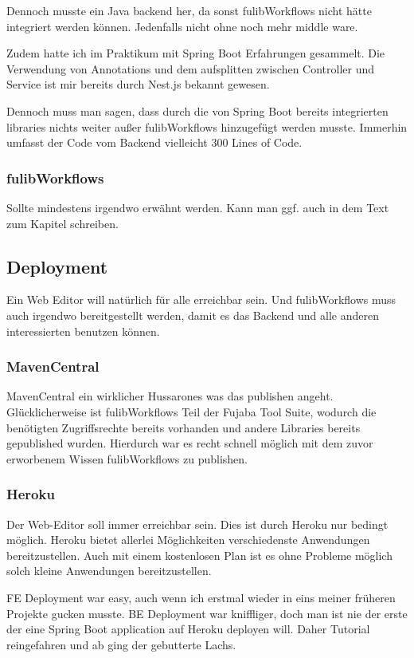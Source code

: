 Dennoch musste ein Java backend her, da sonst fulibWorkflows nicht hätte integriert werden können.
Jedenfalls nicht ohne noch mehr middle ware.

Zudem hatte ich im Praktikum mit Spring Boot Erfahrungen gesammelt.
Die Verwendung von Annotations und dem aufsplitten zwischen Controller und Service ist mir bereits
durch Nest.js bekannt gewesen.

Dennoch muss man sagen, dass durch die von Spring Boot bereits integrierten libraries nichts weiter
außer fulibWorkflows hinzugefügt werden musste.
Immerhin umfasst der Code vom Backend vielleicht 300 Lines of Code.

\subsubsection{fulibWorkflows}
\todo
Sollte mindestens irgendwo erwähnt werden.
Kann man ggf. auch in dem Text zum Kapitel schreiben.

\subsection{Deployment}\label{subsec:deployment}
\todo
Ein Web Editor will natürlich für alle erreichbar sein.
Und fulibWorkflows muss auch irgendwo bereitgestellt werden, damit es das Backend und alle anderen
interessierten benutzen können.

\subsubsection{MavenCentral}\label{subsubsec:mavencentral}
\todo
MavenCentral ein wirklicher Hussarones was das publishen angeht.
Glücklicherweise ist fulibWorkflows Teil der Fujaba Tool Suite, wodurch die benötigten
Zugriffsrechte bereits vorhanden und andere Libraries bereits gepublished wurden.
Hierdurch war es recht schnell möglich mit dem zuvor erworbenem Wissen fulibWorkflows
zu publishen.

\subsubsection{Heroku}\label{subsubsec:heroku}
\todo
Der Web-Editor soll immer erreichbar sein.
Dies ist durch Heroku nur bedingt möglich.
Heroku bietet allerlei Möglichkeiten verschiedenste Anwendungen bereitzustellen.
Auch mit einem kostenlosen Plan ist es ohne Probleme möglich solch kleine Anwendungen bereitzustellen.

FE Deployment war easy, auch wenn ich erstmal wieder in eins meiner früheren Projekte gucken musste.
BE Deployment war kniffliger, doch man ist nie der erste der eine Spring Boot application
auf Heroku deployen will.
Daher Tutorial reingefahren und ab ging der gebutterte Lachs.